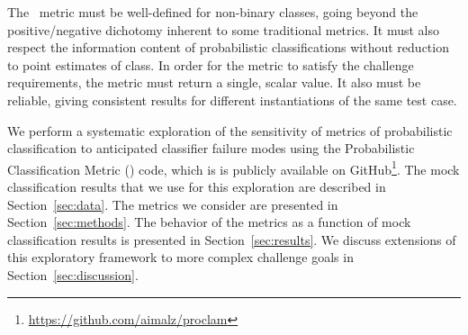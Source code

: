 The \plasticc\ metric must be well-defined for non-binary classes, going beyond the positive/negative dichotomy inherent to some traditional metrics.
It must also respect the information content of probabilistic classifications without reduction to point estimates of class.
In order for the metric to satisfy the challenge requirements, the metric must return a single, scalar value.
It also must be reliable, giving consistent results for different instantiations of the same test case.

We perform a systematic exploration of the sensitivity of metrics of probabilistic classification to anticipated classifier failure modes using the Probabilistic Classification Metric (\proclam) code, which is is publicly available on GitHub\footnote{\url{https://github.com/aimalz/proclam}}.
The mock classification results that we use for this exploration are described in Section~\ref{sec:data}.
The metrics we consider are presented in Section~\ref{sec:methods}.
The behavior of the metrics as a function of mock classification results is presented in Section~\ref{sec:results}.
We discuss extensions of this exploratory framework to more complex challenge goals in Section~\ref{sec:discussion}.
